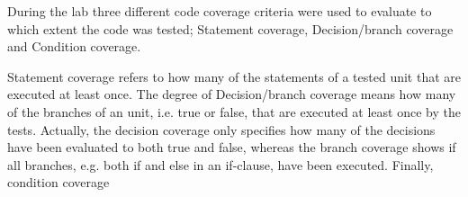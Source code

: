 During the lab three different code coverage criteria were used to evaluate to which extent the code was tested; Statement coverage, Decision/branch coverage and Condition coverage. 

Statement coverage refers to how many of the statements of a tested unit that are executed at least once. The degree of Decision/branch coverage means how many of the branches of an unit, i.e. true or false, that are executed at least once by the tests. Actually, the decision coverage only specifies how many of the decisions have been evaluated to both true and false, whereas the branch coverage shows if all branches, e.g. both if and else in an if-clause, have been executed. Finally, condition coverage 
